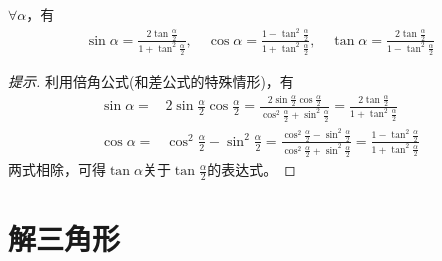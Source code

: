 \begin{theorem}[万能公式]$\forall \alpha$，有
  \begin{align*}
    \sin\alpha = \frac{2\tan\frac\alpha2}{1+\tan^2\frac\alpha2}, \quad
    \cos\alpha = \frac{1-\tan^2\frac\alpha2}{1+\tan^2\frac\alpha2},\quad
    \tan\alpha = \frac{2\tan\frac\alpha2}{1-\tan^2\frac\alpha2}
  \end{align*}  
\end{theorem}
\begin{proof}[提示]
  利用倍角公式(和差公式的特殊情形)，有
  \begin{align*}
    \sin\alpha ={}& 2\sin\frac\alpha2\cos\frac\alpha2
                    = \frac{2\sin\frac\alpha2\cos\frac\alpha2}{\cos^2\frac\alpha2 + \sin^2\frac\alpha2}
                    = \frac{2\tan\frac\alpha2}{1 + \tan^2\frac\alpha2}\\
    \cos\alpha={}& \cos^2\frac\alpha2 - \sin^2\frac\alpha2
                   =\frac{\cos^2\frac\alpha2 - \sin^2\frac\alpha2}{\cos^2\frac\alpha2 + \sin^2\frac\alpha2}
                   =\frac{1-\tan^2\frac\alpha2}{1+\tan^2\frac\alpha2}    
  \end{align*}
  两式相除，可得$\tan\alpha$关于$\tan\frac\alpha2$的表达式。
\end{proof}

\section{解三角形}
\label{sec:solving-triangle}

